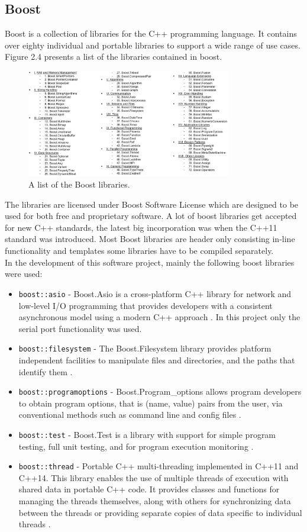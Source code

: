 \subsection{Boost}
Boost is a collection of libraries for the C++ programming language. It contains over eighty individual and portable libraries to support a wide range of use cases. Figure 2.4 presents a list of the libraries contained in boost.
\begin{figure}[h]
\centering
      \includegraphics[width=0.8\textwidth]{boost}
        \caption{A list of the Boost libraries.}
\end{figure}
The libraries are licensed under Boost Software License \cite{boostliz} which are designed to be used for both free and proprietary software. A lot of boost libraries get accepted for new C++ standards, the latest big incorporation was when the C++11 standard was introduced. Most Boost libraries are header only consisting in-line functionality and templates some libraries have to be compiled separately.\\
In the development of this software project, mainly the following boost libraries were used:
\begin{itemize}
\item \texttt{boost::asio} - Boost.Asio is a cross-platform C++ library for network and low-level I/O programming that provides developers with a consistent asynchronous model using a modern C++ approach \cite{boost_asio}. In this project only the serial port functionality was used.
\item \texttt{boost::filesystem} - The Boost.Filesystem library provides platform independent facilities to manipulate files and directories, and the paths that identify them \cite{boost_files}.
\item \texttt{boost::programoptions} - Boost.Program\_options allows program developers to obtain program options, that is (name, value) pairs from the user, via conventional methods such as command line and config files \cite{boost_po}. 
\item \texttt{boost::test} - Boost.Test is a library with support for simple program testing, full unit testing, and for program execution monitoring \cite{boost_test}.
\item \texttt{boost::thread} - Portable C++ multi-threading implemented in C++11 and C++14. This library  enables the use of multiple threads of execution with shared data in portable C++ code. It provides classes and functions for managing the threads themselves, along with others for synchronizing data between the threads or providing separate copies of data specific to individual threads \cite{boost_thread}. 
\end{itemize}

